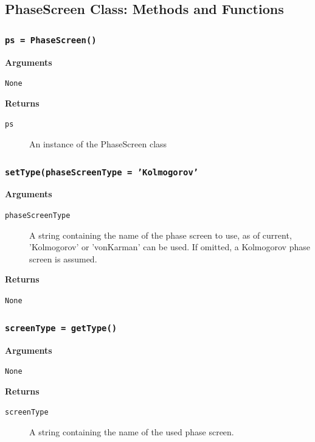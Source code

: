 \documentclass{article}
\begin{document}
\newpage
\subsection{PhaseScreen Class: Methods and Functions}
\subsubsection*{\texttt{ps = PhaseScreen()}}
\textbf{Arguments}
\begin{description}
	\item[\texttt{None}]
\end{description}
\textbf{Returns}
\begin{description}
	\item[\texttt{ps}]
	An instance of the PhaseScreen class
\end{description}

\newpage
\subsubsection*{\texttt{setType(phaseScreenType = 'Kolmogorov'}}
\textbf{Arguments}
\begin{description}
	\item[\texttt{phaseScreenType}]
	A string containing the name of the phase screen to use, as of current, 'Kolmogorov' or 'vonKarman' can be used. If omitted, a Kolmogorov phase screen is assumed.
\end{description}
\textbf{Returns}
\begin{description}
	\item[\texttt{None}]
\end{description}

\newpage
\subsubsection*{\texttt{screenType = getType()}}
\textbf{Arguments}
\begin{description}
	\item[\texttt{None}]
\end{description}
\textbf{Returns}
\begin{description}
	\item[\texttt{screenType}]
	A string containing the name of the used phase screen.
\end{description}

\newpage
\end{document}
